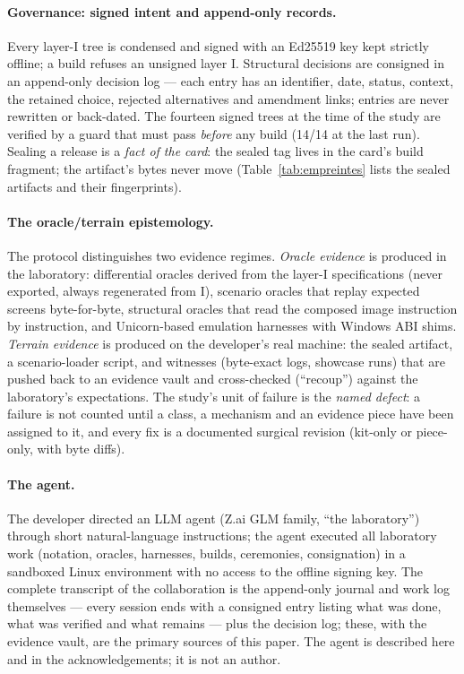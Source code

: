 \documentclass[11pt,a4paper]{article}
\begin{document}
\paragraph{Governance: signed intent and append-only records.}
Every layer-I tree is condensed and signed with an Ed25519 key kept
strictly offline; a build refuses an unsigned layer I. Structural
decisions are consigned in an append-only decision log --- each entry has
an identifier, date, status, context, the retained choice, rejected
alternatives and amendment links; entries are never rewritten or
back-dated. The fourteen signed trees at the time of the study are verified
by a guard that must pass \emph{before} any build (14/14 at the last
run). Sealing a release is a \emph{fact of the card}: the sealed tag
lives in the card's build fragment; the artifact's bytes never move
(Table~\ref{tab:empreintes} lists the sealed artifacts and their
fingerprints).

\paragraph{The oracle/terrain epistemology.}
The protocol distinguishes two evidence regimes. \emph{Oracle evidence} is
produced in the laboratory: differential oracles derived from the layer-I
specifications (never exported, always regenerated from I), scenario
oracles that replay expected screens byte-for-byte, structural oracles
that read the composed image instruction by instruction, and Unicorn-based
emulation harnesses with Windows ABI shims. \emph{Terrain evidence} is
produced on the developer's real machine: the sealed artifact, a
scenario-loader script, and witnesses (byte-exact logs, showcase runs)
that are pushed back to an evidence vault and cross-checked (``recoup'')
against the laboratory's expectations. The study's unit of failure is the
\emph{named defect}: a failure is not counted until a class, a mechanism
and an evidence piece have been assigned to it, and every fix is a
documented surgical revision (kit-only or piece-only, with byte diffs).

\paragraph{The agent.}
The developer directed an LLM agent (Z.ai GLM family, ``the laboratory'')
through short natural-language instructions; the agent executed all
laboratory work (notation, oracles, harnesses, builds, ceremonies,
consignation) in a sandboxed Linux environment with no access to the
offline signing key. The complete transcript of the collaboration is the
append-only journal and work log themselves --- every session ends with a
consigned entry listing what was done, what was verified and what remains
--- plus the decision log; these, with the evidence vault, are the
primary sources of this paper. The agent is described here and in the
acknowledgements; it is not an author.
\end{document}
